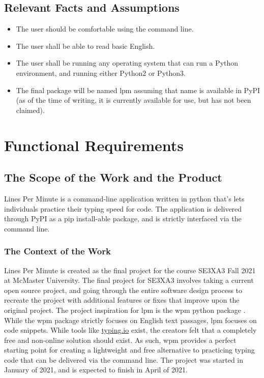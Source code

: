 \documentclass[12pt, titlepage]{article}
\begin{document}
\subsection{Relevant Facts and Assumptions}
\begin{itemize}
    \item The user should be comfortable using the command line.
    \item The user shall be able to read basic English.
    \item The user shall be running any operating system that can run a Python environment, and running either Python2 or Python3.
    \item The final package will be named lpm assuming that name is available in PyPI (as of the time of writing, it is currently available for use, but has not been claimed).
\end{itemize}


\section{Functional Requirements}

\subsection{The Scope of the Work and the Product}
Lines Per Minute is a command-line application written in python that's lets individuals practice their typing speed for code. The application is delivered through PyPI as a pip install-able package, and is strictly interfaced via the command line.

\subsubsection{The Context of the Work}
Lines Per Minute is created as the final project for the course SE3XA3 Fall 2021 at McMaster University. The final project for SE3XA3 involves taking a current open source project, and going through the entire software design process to recreate the project with additional features or fixes that improve upon the original project. The project inspiration for lpm is the wpm python package \citep{wpm}. \\

While the wpm package strictly focuses on English text passages, lpm focuses on code snippets. While tools like \href{https://typing.io/}{typing.io} exist, the creators felt that a completely free and non-online solution should exist. As such, wpm provides a perfect starting point for creating a lightweight and free alternative to practicing typing code that can be delivered via the command line. The project was started in January of 2021, and is expected to finish in April of 2021.
\end{document}
